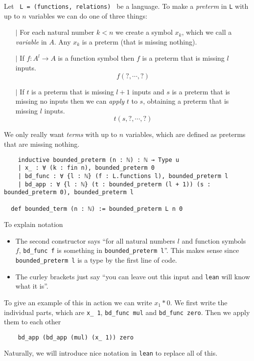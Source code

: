 \begin{dfn}[Terms]
  Let \texttt{ L = (functions, relations) } be a language.
  To make a \textit{preterm} in \texttt{L} with up to $n$ variables
  we can do one of three things:
  \begin{itemize}
    \item[$\vert$] For each natural number $k < n$ we create a symbol
          $x_{k}$, which we call a \textit{variable} in $A$.
          Any $x_{k}$ is a preterm (that is missing nothing).
    \item[$\vert$] If $f : A^{l} \to A$ is a function symbol then
          $f$ is a preterm that is missing $l$ inputs.
          \[ f( ? , \cdots , ? )\]
    \item[$\vert$] If $t$ is a preterm that is missing
          $l + 1$ inputs and $s$ is a preterm that is missing
          no inputs then we can \textit{apply} $t$ to $s$, obtaining
          a preterm that is missing $l$ inputs.
          \[ t(s , ? , \cdots, ? )\]
  \end{itemize}

  We only really want \textit{terms} with up to $n$ variables,
  which are defined as preterms that are missing nothing.

  \begin{lstlisting}
    inductive bounded_preterm (n : ℕ) : ℕ → Type u
    | x_ : ∀ (k : fin n), bounded_preterm 0
    | bd_func : ∀ {l : ℕ} (f : L.functions l), bounded_preterm l
    | bd_app : ∀ {l : ℕ} (t : bounded_preterm (l + 1)) (s : bounded_preterm 0), bounded_preterm l

  def bounded_term (n : ℕ) := bounded_preterm L n 0\end{lstlisting}

  To explain notation
  \begin{itemize}
    \item The second constructor says ``for all natural numbers $l$ and function symbols $f$,
          \texttt{bd\_func f} is something in \texttt{bounded\_preterm l}''.
          This makes sense since \texttt{bounded\_preterm l} is a type by the first line of code.
    \item The curley brackets just say
          ``you can leave out this input and \texttt{lean} will know what it is''.
  \end{itemize}

  To give an example of this in action we can write $x_{1} * 0$.
  We first write the individual parts, which are
  \texttt{x\_ 1}, \texttt{bd\_func mul} and
  \texttt{bd\_func zero}.
  Then we apply them to each other
  \begin{lstlisting}
    bd_app (bd_app (mul) (x_ 1)) zero \end{lstlisting}
  Naturally, we will introduce nice notation in \texttt{lean} to replace all of this.
\end{dfn}

